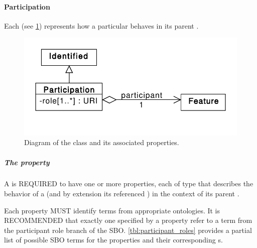 \paragraph{Participation}
\label{sec:Participation}

Each  (see \ref{uml:participation}) represents how a particular  behaves in its parent .

\begin{figure}[ht]
\begin{center}
\includegraphics[scale=0.6]{uml/participation}
\caption[]{Diagram of the  class and its associated properties.}
\label{uml:participation}
\end{center}
\end{figure}

\subparagraph{The  property}\label{sec:role:P}

A  is REQUIRED to have one or more  properties, each of type  that describes the behavior of a  (and by extension its referenced ) in the context of its parent .

Each  property MUST identify terms from appropriate ontologies. It is RECOMMENDED that exactly one  specified by a  property refer to a term from the participant role branch of the SBO. \ref{tbl:participant_roles} provides a partial list of possible SBO terms for the  properties and their corresponding s.

